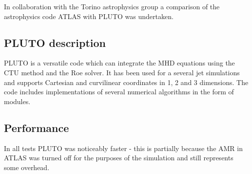 
In collaboration with the Torino astrophysics group a comparison of the astrophysics code ATLAS with PLUTO \citep{2004Ap&SS.293..199M} was undertaken.

\subsection{PLUTO description}
PLUTO is a versatile code which can integrate the MHD equations using the CTU method and the Roe solver. It has been used for a several jet simulations and supports Cartesian and curvilinear coordinates in 1, 2 and 3 dimensions.
The code includes implementations of several numerical algorithms in the form of modules.

\subsection{Performance}
In all tests PLUTO was noticeably faster - this is partially because the AMR in ATLAS was turned off for the purposes of the simulation and still represents some overhead.


